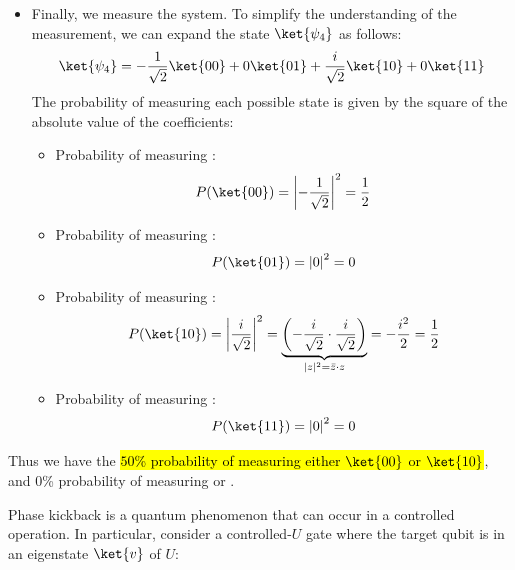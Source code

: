 \begin{itemize}
    \item Finally, we measure the system. To simplify the understanding of the measurement, we can expand the state $\ket{\psi_{4}}$ as follows:
        \begin{equation*}
            \ket{\psi_{4}} = -\frac{1}{\sqrt{2}}\ket{00} + 0\ket{01} + \frac{i}{\sqrt{2}} \ket{10} + 0\ket{11}
        \end{equation*}
        The probability of measuring each possible state is given by the square of the absolute value of the coefficients:
        \begin{itemize}
            \item Probability of measuring :
                \begin{equation*}
                    P(\ket{00}) = \left|-\frac{1}{\sqrt{2}}\right|^2 = \frac{1}{2}
                \end{equation*}
            \item Probability of measuring :
                \begin{equation*}
                    P(\ket{01}) = \left|0\right|^2 = 0
                \end{equation*}
            \item Probability of measuring :
                \begin{equation*}
                    P(\ket{10}) = \left|\frac{i}{\sqrt{2}}\right|^2 = \underbrace{\left(
                            -\frac{i}{\sqrt{2}} \cdot \frac{i}{\sqrt{2}}
                    \right)}_{|z|^2 = \bar{z} \cdot z} = -\frac{i^2}{2} = \frac{1}{2}
                \end{equation*}
            \item Probability of measuring :
                \begin{equation*}
                    P(\ket{11}) = \left|0\right|^2 = 0
                \end{equation*}
        \end{itemize}
\end{itemize}
Thus we have the \hl{$50$\% probability of measuring either $\ket{00}$ or $\ket{10}$}, and $0$\% probability of measuring  or .

\highspace
{}
Phase kickback is a quantum phenomenon that can occur in a controlled operation. In particular, consider a controlled-$U$ gate where the target qubit is in an eigenstate $\ket{v}$ of $U$:

